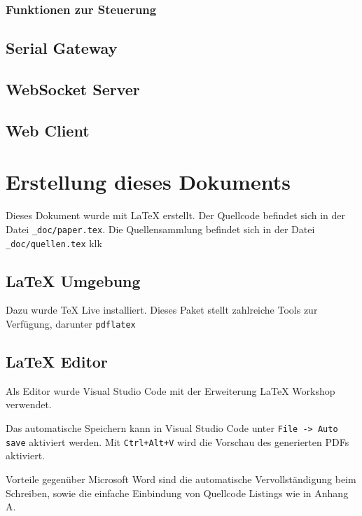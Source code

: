 \subsubsection{Funktionen zur Steuerung}


\newpage
\subsection{Serial Gateway}


\newpage
\subsection{WebSocket Server}


\newpage
\subsection{Web Client}


\newpage
\section{Erstellung dieses Dokuments}
Dieses Dokument wurde mit LaTeX erstellt. Der Quellcode befindet sich in der Datei
\verb|_doc/paper.tex|. Die Quellensammlung befindet sich in der Datei \verb|_doc/quellen.tex| klk

\subsection{LaTeX Umgebung}
Dazu wurde TeX Live \cite{texlive} installiert. Dieses
Paket stellt zahlreiche Tools zur Verfügung, darunter  \verb|pdflatex|

\subsection{LaTeX Editor}
Als Editor wurde Visual Studio Code \cite{vscode} mit der Erweiterung LaTeX Workshop \cite{latexWorkshop} verwendet.

Das automatische Speichern kann in Visual Studio Code unter \verb|File -> Auto save| aktiviert werden. Mit \verb|Ctrl+Alt+V| wird die Vorschau des generierten PDFs aktiviert. 

Vorteile gegenüber Microsoft Word sind die automatische Vervollständigung beim Schreiben, sowie die einfache Einbindung von Quellcode Listings wie in Anhang A.


